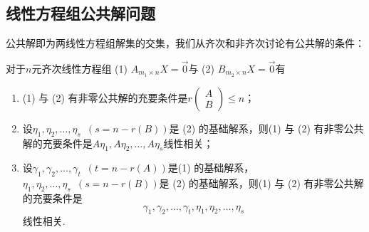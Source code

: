 \subsection{线性方程组公共解问题}

公共解即为两线性方程组解集的交集，我们从齐次和非齐次讨论有公共解的条件：
\begin{theorem}{}{}
    对于$n$元齐次线性方程组 (1) $A_{m_1 \times n}X=\vec{0}$与 (2) $B_{m_2 \times n}X=\vec{0}$有
    \begin{enumerate}
        \item (1) 与 (2) 有非零公共解的充要条件是$r\begin{pmatrix} A \\ B \end{pmatrix} \leq n$；

        \item 设$\eta_1,\eta_2,\ldots,\eta_s\enspace(s=n-r(B))$是 (2) 的基础解系，则(1) 与 (2) 有非零公共解的充要条件是$A\eta_1,A\eta_2,\ldots,A\eta_s$线性相关；

        \item 设$\gamma_1,\gamma_2,\ldots,\gamma_t\enspace(t=n-r(A))$是(1) 的基础解系，$\eta_1,\eta_2,\ldots,\eta_s\enspace(s=n-r(B))$是 (2) 的基础解系，则(1) 与 (2) 有非零公共解的充要条件是
              \[\gamma_1,\gamma_2,\ldots,\gamma_t,\eta_1,\eta_2,\ldots,\eta_s\]
              线性相关.
    \end{enumerate}
\end{theorem}


